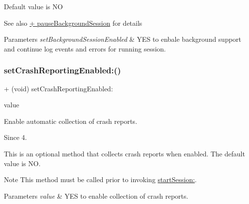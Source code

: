 Default value is {\ttfamily NO} 

\begin{DoxySeeAlso}{See also}
\hyperlink{interfaceFlurry_a57e18dc7c992272e3dc89e7f3bc853f4}{+ pause\+Background\+Session} for details
\end{DoxySeeAlso}

\begin{DoxyParams}{Parameters}
{\em set\+Background\+Session\+Enabled} & Y\+ES to enbale background support and continue log events and errors for running session. \\
\hline
\end{DoxyParams}
\mbox{\label{interfaceFlurry_a20dbc3ff9cc3c114aad7e7713547dfe1}} 
\subsubsection{\texorpdfstring{set\+Crash\+Reporting\+Enabled\+:()}{setCrashReportingEnabled:()}}
{\footnotesize\ttfamily + (void) set\+Crash\+Reporting\+Enabled\+: \begin{DoxyParamCaption}\item[{(B\+O\+OL)}]{value }\end{DoxyParamCaption}}



Enable automatic collection of crash reports. 

\begin{DoxySince}{Since}
4.
\end{DoxySince}
This is an optional method that collects crash reports when enabled. The default value is {\ttfamily NO}.

\begin{DoxyNote}{Note}
This method must be called prior to invoking \hyperlink{interfaceFlurry_aeadfa23545c392ffd46db448b6a95809}{start\+Session\+:}.
\end{DoxyNote}

\begin{DoxyParams}{Parameters}
{\em value} & {\ttfamily Y\+ES} to enable collection of crash reports. \\
\hline
\end{DoxyParams}
\mbox{\label{interfaceFlurry_a68104a89eff2e63d71b413d3212c5178}} 
